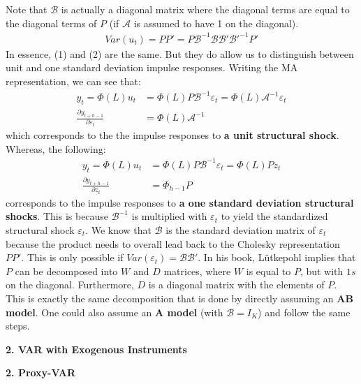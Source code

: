 \documentclass[a4paper, 12pt]{article}
\begin{document}
Note that $\mathcal{B}$ is actually a diagonal matrix where the diagonal terms are equal to the diagonal terms of $P$ (if $\mathcal{A}$ is assumed to have 1 on the diagonal).
\begin{equation}
\begin{aligned}
Var(u_t)=PP'=P\mathcal{B}^{-1}\mathcal{B}\mathcal{B}'\mathcal{B}'^{-1}P' 
\end{aligned}
\end{equation}
In essence, (1) and (2) are the same. But they do allow us to distinguish between unit and one standard deviation impulse responses. Writing the MA representation, we can see that:
\begin{equation}
\begin{aligned}
y_t=\Phi(L)u_{t}&=\Phi(L)P\mathcal{B}^{-1}\varepsilon_t=\Phi(L)\mathcal{A}^{-1}\varepsilon_t\nonumber \\
\frac{\partial y_{t+h-1}}{\partial \varepsilon_{t}}&=\Phi(L)\mathcal{A}^{-1} \nonumber
\end{aligned}
\end{equation}
which corresponds to the the impulse responses to \textbf{a unit structural shock}. Whereas, the following:
\begin{equation}
\begin{aligned}
y_t=\Phi(L)u_{t}&=\Phi(L)P\mathcal{B}^{-1}\varepsilon_t=\Phi(L)Pz_t\nonumber \\
\frac{\partial y_{t+h-1}}{\partial z_{t}}&=\Phi_{h-1}P \nonumber
\end{aligned}
\end{equation}
corresponds to the impulse responses to \textbf{a one standard deviation structural shocks}. This is because $\mathcal{B}^{-1}$ is multiplied with $\varepsilon_t$ to yield the standardized structural shock $\varepsilon_t$.
We know that $\mathcal{B}$ is the standard deviation matrix of $\varepsilon_t$ because the product needs to overall lead back to the Cholesky representation $PP'$. This is only possible if $Var(\varepsilon_t)=\mathcal{B}\mathcal{B}'$. 
In his book, Lütkepohl implies that $P$ can be decomposed into $W$ and $D$ matrices, where $W$ is equal to $P$, but with $1s$ on the diagonal. Furthermore, $D$ is a diagonal matrix with the elements of $P$. 
This is exactly the same decomposition that is done by directly assuming an \textbf{AB model}. One could also assume an \textbf{A model} (with $\mathcal{B}=I_K$) and follow the same steps. 
\begin{center}
\textbf{2. VAR with Exogenous Instruments}
\end{center}
\begin{center}
\textbf{2. Proxy-VAR}
\end{center}
\end{document}
